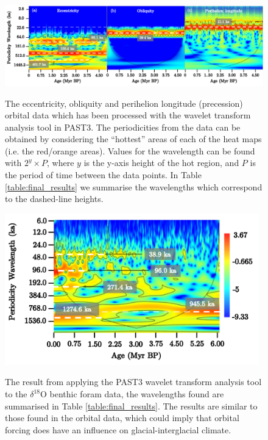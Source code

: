 \documentclass[12pt, onecolumn]{revtex4}    %
\begin{document}
\begin{figure}[!h]
\begin{center}
\includegraphics[width=16.2cm]{figures/wa_orbital_data}
\caption[]{The eccentricity, obliquity and perihelion longitude (precession) orbital data which has been processed with the wavelet transform analysis tool in PAST3. The periodicities from the data can be obtained by considering the ``hottest'' areas of each of the heat maps (i.e. the red/orange areas). Values for the wavelength can be found with $2^y \times P$, where $y$ is the y-axis height of the hot region, and $P$ is the period of time between the data points. In Table \ref{table:final_results} we summarise the wavelengths which correspond to the dashed-line heights.}
\vspace{-3ex}
\label{fig:wa_orbital_data}
\end{center}
\end{figure}

\begin{figure}[!h]
\begin{center}
\includegraphics[width=11cm]{figures/wa_d18O.pdf}
\caption[]{The result from applying the PAST3 wavelet transform analysis tool to the $\delta^{18}$O benthic foram data, the wavelengths found are summarised in Table \ref{table:final_results}. The results are similar to those found in the orbital data, which could imply that orbital forcing does have an influence on glacial-interglacial climate.}
\vspace{-3ex}
\label{fig:wa_d18o}
\end{center}
\end{figure}
\end{document}
